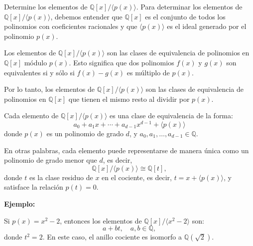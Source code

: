 Determine los elementos de \( \mathbb{Q}[x] / \langle p(x) \rangle \).
Para determinar los elementos de \( \mathbb{Q}[x] / \langle p(x) \rangle \), debemos entender que \( \mathbb{Q}[x] \) es el conjunto de todos los polinomios con coeficientes racionales y que \( \langle p(x) \rangle \) es el ideal generado por el polinomio \( p(x) \). 

Los elementos de \( \mathbb{Q}[x] / \langle p(x) \rangle \) son las clases de equivalencia de polinomios en \( \mathbb{Q}[x] \) módulo \( p(x) \). Esto significa que dos polinomios \( f(x) \) y \( g(x) \) son equivalentes si y sólo si \( f(x) - g(x) \) es múltiplo de \( p(x) \).

Por lo tanto, los elementos de \( \mathbb{Q}[x] / \langle p(x) \rangle \) son las clases de equivalencia de polinomios en \( \mathbb{Q}[x] \) que tienen el mismo resto al dividir por \( p(x) \).

Cada elemento de \( \mathbb{Q}[x] / \langle p(x) \rangle \) es una clase de equivalencia de la forma:
\[
a_0 + a_1 x + \cdots + a_{d-1} x^{d-1} + \langle p(x) \rangle
\]
donde \( p(x) \) es un polinomio de grado \( d \), y \( a_0, a_1, \dots, a_{d-1} \in \mathbb{Q} \).

En otras palabras, cada elemento puede representarse de manera única como un polinomio de grado menor que \( d \), es decir,
\[
\mathbb{Q}[x] / \langle p(x) \rangle \cong \mathbb{Q}[t],
\]
donde \( t \) es la clase residuo de \( x \) en el cociente, es decir, \( t = x + \langle p(x) \rangle \), y satisface la relación \( p(t) = 0 \).

\textbf{Ejemplo:}

Si \( p(x) = x^2 - 2 \), entonces los elementos de \( \mathbb{Q}[x] / \langle x^2 - 2 \rangle \) son:
\[
a + b t, \quad a, b \in \mathbb{Q},
\]
donde \( t^2 = 2 \). En este caso, el anillo cociente es isomorfo a \( \mathbb{Q}(\sqrt{2}) \).

